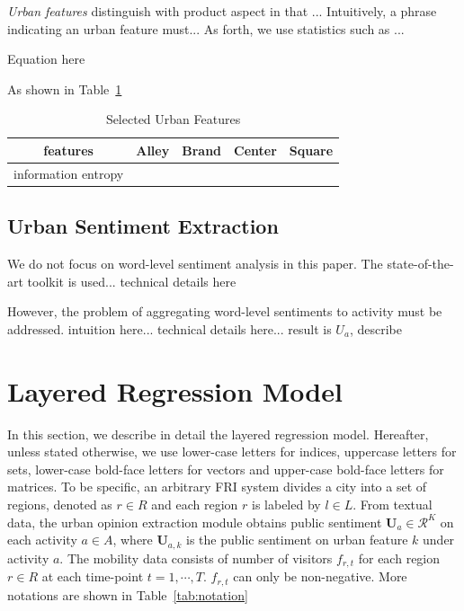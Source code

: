 \documentclass[runningheads]{llncs}
\begin{document}
\emph{Urban features} distinguish with product aspect in that ...
Intuitively, a phrase indicating an urban feature must...
As forth, we use statistics such as ...

Equation here

As shown in Table~\ref{tab:urbanfeatures}

\begin{table}[h]
\centering
\caption{Selected Urban Features}
\label{tab:urbanfeatures}
\begin{tabular}{c|c|c|c|c}
\hline
features &  Alley & Brand & Center & Square\\
\hline
information entropy &  &  &  & \\
\hline
\end{tabular}
\end{table}


\subsection{Urban Sentiment Extraction}
We do not focus on word-level sentiment analysis in this paper.
The state-of-the-art toolkit is used...
technical details here

However, the problem of aggregating word-level sentiments to activity must be addressed.
intuition here...
technical details here...
result is $U_a$, describe

\section{Layered Regression Model}\label{sec:regression}
In this section, we describe in detail the layered regression model. Hereafter, unless stated otherwise, we use lower-case letters for indices, uppercase letters for sets, lower-case bold-face letters for vectors and upper-case bold-face letters for matrices. To be specific, an arbitrary FRI system divides a city into a set of regions, denoted as $r\in R$ and each region $r$ is labeled by $l\in L$. From textual data, the urban opinion extraction module obtains public sentiment $\mathbf{U}_a\in \mathcal{R}^{K}$ on each activity $a\in A$, where $\mathbf{U}_{a,k}$ is the public sentiment on urban feature $k$ under activity $a$. The mobility data consists of number of visitors $f_{r,t}$ for each region $r\in R$ at each time-point $t=1,\cdots,T$. $f_{r,t}$ can only be non-negative. More notations are shown in Table~\ref{tab:notation} 
\end{document}
